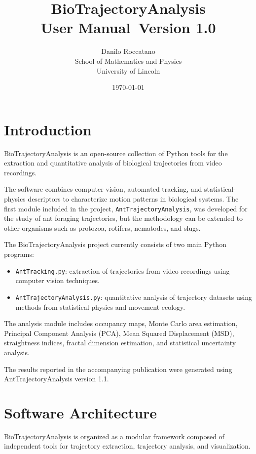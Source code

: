 \documentclass[11pt,a4paper]{article}
\title{BioTrajectoryAnalysis\\
User Manual\
Version 1.0}
\author{Danilo Roccatano\\
School of Mathematics and Physics\\
University of Lincoln}
\date{\today}
\begin{document}
\maketitle

\tableofcontents

\section{Introduction}

BioTrajectoryAnalysis is an open-source collection of Python tools for the extraction and quantitative analysis of biological trajectories from video recordings.

The software combines computer vision, automated tracking, and statistical-physics descriptors to characterize motion patterns in biological systems. The first module included in the project, \texttt{AntTrajectoryAnalysis}, was developed for the study of ant foraging trajectories, but the methodology can be extended to other organisms such as protozoa, rotifers, nematodes, and slugs.


The BioTrajectoryAnalysis project currently consists of two main Python
programs:

\begin{itemize}
\item \texttt{AntTracking.py}: extraction of trajectories from video
recordings using computer vision techniques.

\item \texttt{AntTrajectoryAnalysis.py}: quantitative analysis of
trajectory datasets using methods from statistical physics and movement
ecology.
\end{itemize}

The analysis module includes occupancy maps, Monte Carlo area
estimation, Principal Component Analysis (PCA), Mean Squared
Displacement (MSD), straightness indices, fractal dimension estimation,
and statistical uncertainty analysis.

The results reported in the accompanying publication were generated
using AntTrajectoryAnalysis version 1.1.

\section{Software Architecture}

BioTrajectoryAnalysis is organized as a modular framework composed of independent tools for trajectory extraction, trajectory analysis, and visualization.
\end{document}
